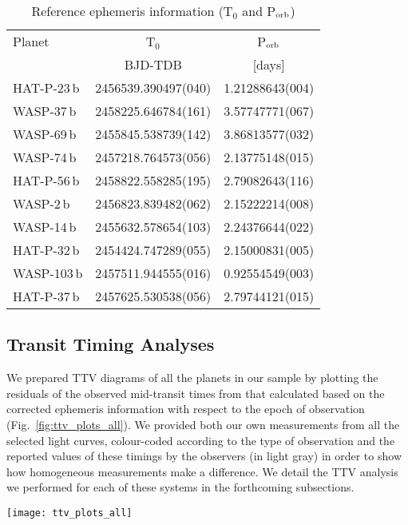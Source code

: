 \documentclass[a4paper,fleqn,usenatbib]{mnras}
\begin{document}
\begin{table}
\centering
\caption{Reference ephemeris information (T$_0$ and P$_{\rm orb}$)}
\label{tab:ephemeris}
\begin{tabular}{lcc}  
\hline
\hline
Planet & T$_0$ & P$_{\rm orb}$ \\
 & BJD-TDB  & [days]  \\
\hline
HAT-P-23\,b & 2456539.390497(040) & 1.21288643(004) \\
WASP-37\,b & 2458225.646784(161) & 3.57747771(067) \\
WASP-69\,b & 2455845.538739(142) & 3.86813577(032) \\
WASP-74\,b & 2457218.764573(056) & 2.13775148(015) \\
HAT-P-56\,b & 2458822.558285(195) & 2.79082643(116) \\
WASP-2\,b & 2456823.839482(062) & 2.15222214(008) \\
WASP-14\,b & 2455632.578654(103) & 2.24376644(022) \\
HAT-P-32\,b & 2454424.747289(055)  & 2.15000831(005) \\
WASP-103\,b & 2457511.944555(016) & 0.92554549(003) \\
HAT-P-37\,b & 2457625.530538(056)  & 2.79744121(015) \\
\hline
\end{tabular}
\end{table}

\subsection{Transit Timing Analyses}
\label{subsec:ttv}
We prepared TTV diagrams of all the planets in our sample by plotting the residuals of the observed mid-transit times from that calculated based on the corrected ephemeris information with respect to the epoch of observation (Fig.~\ref{fig:ttv_plots_all}). We provided both our own measurements from all the selected light curves, colour-coded according to the type of observation and the reported values of these timings by the observers (in light gray) in order to show how homogeneous measurements make a difference. We detail the TTV analysis we performed for each of these systems in the forthcoming subsections.

\begin{figure*}
\texttt{[image: ttv\_plots\_all]}
\caption{TTV diagrams for all the planets in our sample based on observations from open databases (green), our observations (red), and light curves published in the literature (blue). The mid-transit times reported by the observers are shown in gray for comparison for the same light curves except our own.}
    \label{fig:ttv_plots_all}
\end{figure*}
\end{document}

